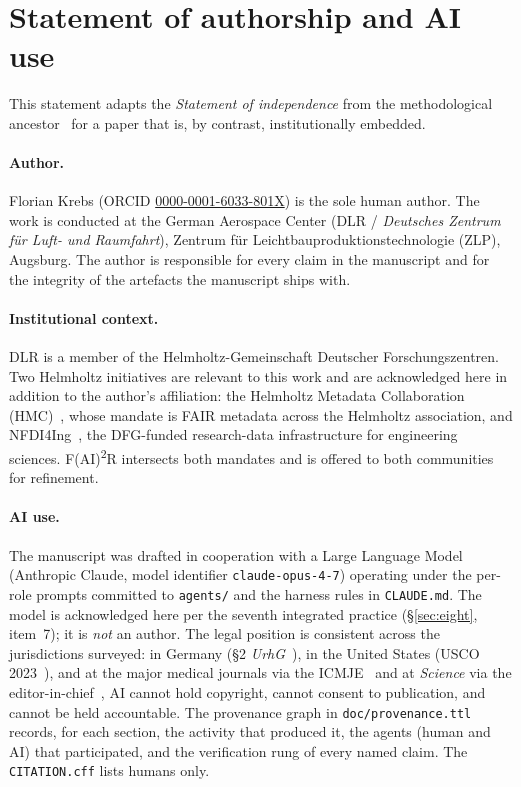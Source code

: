 \section*{Statement of authorship and AI use}
\label{sec:authorship-statement}

This statement adapts the \emph{Statement of independence} from the
methodological ancestor~\cite{krebs2026obscurity} for a paper that
is, by contrast, institutionally embedded.

\paragraph{Author.}
Florian Krebs (ORCID
\href{https://orcid.org/0000-0001-6033-801X}{0000-0001-6033-801X})
is the sole human author. The work is conducted at the German
Aerospace Center (DLR / \emph{Deutsches Zentrum für Luft- und
Raumfahrt}), Zentrum für Leichtbauproduktionstechnologie (ZLP),
Augsburg. The author is responsible for every claim in the
manuscript and for the integrity of the artefacts the manuscript
ships with.

\paragraph{Institutional context.}
DLR is a member of the Helmholtz-Gemeinschaft Deutscher
Forschungszentren. Two Helmholtz initiatives are relevant to this
work and are acknowledged here in addition to the author's
affiliation: the Helmholtz Metadata Collaboration
(HMC)~\cite{curdt2025hmc}, whose mandate is FAIR
metadata across the Helmholtz association, and
NFDI4Ing~\cite{schmitt2020nfdi4ing}, the
DFG-funded research-data infrastructure for engineering sciences.
F(AI)\textsuperscript{2}R intersects both mandates and is offered to
both communities for refinement.

\paragraph{AI use.}
The manuscript was drafted in cooperation with a Large Language
Model (Anthropic Claude, model identifier
\texttt{claude-opus-4-7}) operating under the per-role prompts
committed to \texttt{agents/} and the harness rules in
\texttt{CLAUDE.md}. The model is acknowledged here per the seventh
integrated practice (\S\ref{sec:eight}, item~7); it is \emph{not}
an author. The legal position is consistent across the
jurisdictions surveyed: in Germany
(\S2 \emph{UrhG}~\cite{urhg2}), in the United States
(USCO 2023~\cite{usco2023ai}), and at the major medical journals
via the \textsc{ICMJE}~\cite{icmje2023} and at \emph{Science} via
the editor-in-chief~\cite{thorp2023chatgpt}, AI cannot hold
copyright, cannot consent to publication, and cannot be held
accountable. The provenance graph in \texttt{doc/provenance.ttl}
records, for each section, the activity that produced it, the
agents (human and AI) that participated, and the verification rung
of every named claim. The \texttt{CITATION.cff} lists humans only.

